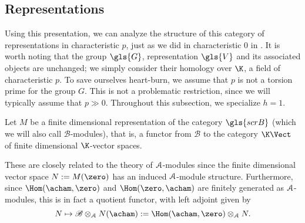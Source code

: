 \subsection{Representations}
\label{sec:reps}
Using this presentation, we can analyze the structure of this category of representations in
characteristic $p$, just as we did in characteristic 0 in \cite[\S
3.3]{WebSD}.   It is worth noting that the group $\gls{G}$, representation
$\gls{V}$ and its associated objects are unchanged; we simply consider their
homology over $\K$, a field of characteristic $p$.  To save ourselves
heart-burn, we assume that $p$ is not a torsion prime for the group
$G$.  This is not a problematic restriction, since we will typically
assume that $p\gg 0$.    Throughout this subsection, we specialize $h=1$.


Let $M$ be a finite dimensional representation
of the category $\gls{scrB}$ (which we will also call $\mathscr{B}$-modules), that is, a functor from $\mathscr{B}$ to the
category $\K\Vect$ of finite dimensional $\K$-vector spaces.  

These are closely related to the theory of $\EuScript{A}$-modules since the finite dimensional vector space $N:=M(\zero)$ has an
induced $\EuScript{A}$-module structure.  Furthermore, since $\Hom(\acham,\zero)$
and $\Hom(\zero,\acham)$ are finitely generated as
$\EuScript{A}$-modules, this is in fact a quotient functor, with left adjoint given by 
\[N\mapsto
\mathscr{B}\otimes_{\EuScript{A}}N(\acham):=\Hom(\acham,\zero)\otimes_{\EuScript{A}}N.\]

